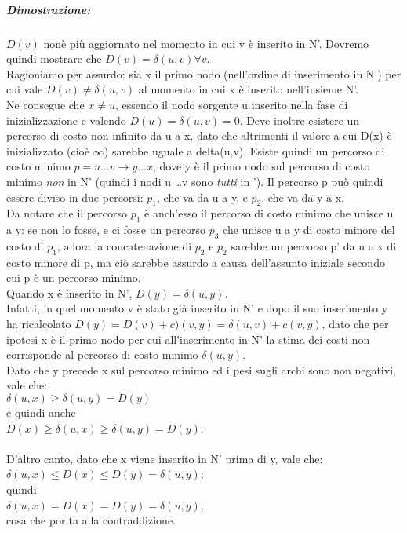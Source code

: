 \subparagraph{Dimostrazione:}
$ D(v) $ nonè più aggiornato nel momento in cui v è inserito in N'. Dovremo quindi mostrare che $ D(v) = \delta(u,v) \forall v$. \\
Ragioniamo per assurdo: sia x il primo nodo (nell'ordine di inserimento in N') per cui vale $ D(v) \neq \delta(u,v) $ al momento in cui x è inserito nell'insieme N'. \\
Ne consegue che $ x \neq u $, essendo il nodo sorgente u inserito nella fase di inizializzazione e valendo $ D(u) = \delta(u,v) = 0 $. Deve inoltre esistere un percorso di costo non infinito da u a x, dato che altrimenti il valore a cui D(x) è inizializzato (cioè $ \infty $) sarebbe uguale a delta(u,v). Esiste quindi un percorso di costo minimo $ p=u \ldots v \to y \ldots x  $, dove y è il primo nodo sul percorso di costo minimo \textit{non} in N' (quindi i nodi u \ldots v sono \textit{tutti} in '). Il percorso p può quindi essere diviso in due percorsi: $ p_{1} $, che va da u a y, e $ p_{2} $, che va da y a x. \\
Da notare che il percorso $ p_{1} $ è anch'esso il percorso di costo minimo che unisce u a y: se non lo fosse, e ci fosse un percorso $ p_{3} $ che unisce u a y di costo minore del costo di $ p_{1} $, allora la concatenazione di $ p_{2} $ e $ p_{2} $ sarebbe un percorso p' da u a x di costo minore di p, ma ciò sarebbe assurdo a causa dell'assunto iniziale secondo cui p è un percorso minimo. \\
Quando x è inserito in N', $ D(y) = \delta(u,y) $. \\
Infatti, in quel momento v è stato già inserito in N' e dopo il suo inserimento y ha ricalcolato $ D(y) = D(v)+c)(v,y) = \delta(u,v)+c(v,y) $, dato che per ipotesi x è il primo nodo per cui all'inserimento in N' la stima dei costi non corrisponde al percorso di costo minimo $ \delta(u,y) $. \\
Dato che y precede x sul percorso minimo ed i pesi sugli archi sono non negativi, vale che: \\
$ \delta(u,x)\geq\delta(u,y)=D(y) $\\
e quindi anche \\
$ D(x) \geq \delta(u,x) \geq \delta(u,y)=D(y) $. \\\\

D'altro canto, dato che x viene inserito in N' prima di y, vale che: \\
$ \delta(u,x) \leq D(x) \leq D(y) = \delta(u,y) $; \\
quindi \\
$ \delta(u,x)=D(x)=D(y)=\delta(u,y) $, \\
cosa che porlta alla contraddizione. \\\\

